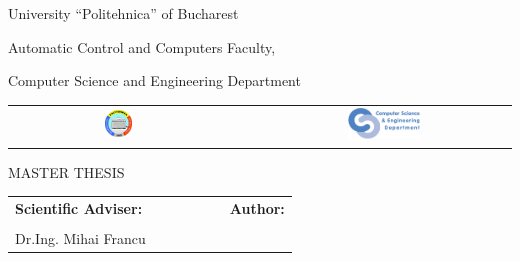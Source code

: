 \begin{titlepage}
	\begin{center}
		{\Large University ``Politehnica'' of Bucharest}
		\par\vspace*{2mm}
		{\Large Automatic Control and Computers Faculty,
		
		Computer Science and Engineering Department}
		\par\vspace*{3mm}
		\begin{table}[h]
        	\begin{center}
				\begin{tabular}{cccc}
                    \includegraphics[width=0.13\textwidth]{src/img/branding/upb}
					& & &
					\includegraphics[width=0.30\textwidth]{src/img/branding/cs}
            	\end{tabular}
			\end{center}
		\end{table}
		
		\par\vspace*{35mm}
		{\Huge MASTER THESIS}
		\par\vspace*{15mm}
		{\Huge \VARtitleen }
		\par\vspace*{35mm}
		\begin{table}[h]
        	\begin{center}
				\begin{tabular}{lcccccl}
					\Large \textbf{\Large Scientific Adviser:}
					\vspace*{1mm} &&&&&& \Large \textbf{\Large Author:}\vspace*{1mm} \\
					\Large \VARadviser &&&&&& \Large \VARauthor \\
					\Large Dr.Ing. Mihai Francu
				\end{tabular}
			\end{center}
		\end{table}

		\par\vspace*{35mm}
		\Large \VARtitlefooteren
	\end{center}
\end{titlepage}
